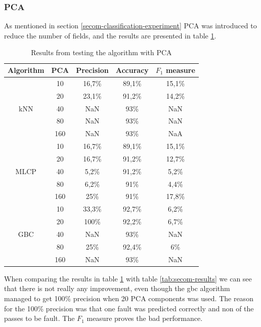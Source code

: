 \documentclass[english, a4paper]{report}
\begin{document}
{{{            \subsubsection{PCA}
            {                
                As mentioned in section \ref{secom-classification-experiment} PCA was introduced to reduce the number of fields, and the results are presented in table \ref{tab:secom-pca-results}.
                \begin{table}[H]
                    \centering
                    \begin{tabular}{|c|c|c|c|c|}
                    \hline
                    \textbf{   Algorithm   } & \textbf{   PCA   } & \textbf{   Precision   } & \textbf{   Accuracy   } & \textbf{   $F_1$ measure   } \\ \hline
                    \multirow{5}{*}{kNN} & 10 & 16,7\% & 89,1\% & 15,1\% \\ \cline{2-5} 
                     & 20 & 23,1\% & 91,2\% & 14,2\% \\ \cline{2-5} 
                     & 40 & NaN & 93\% & NaN \\ \cline{2-5} 
                     & 80 & NaN & 93\% & NaN \\ \cline{2-5} 
                     & 160 & NaN & 93\% & NaA \\ \hline
                    \multirow{5}{*}{MLCP} & 10 & 16,7\% & 89,1\% & 15,1\% \\ \cline{2-5} 
                     & 20 & 16,7\% & 91,2\% & 12,7\% \\ \cline{2-5} 
                     & 40 & 5,2\% & 91,2\% & 5,2\% \\ \cline{2-5} 
                     & 80 & 6,2\% & 91\% & 4,4\% \\ \cline{2-5} 
                     & 160 & 25\% & 91\% & 17,8\% \\ \hline
                    \multirow{5}{*}{GBC} & 10 & 33,3\% & 92,7\% & 6,2\% \\ \cline{2-5} 
                     & 20 & 100\% & 92,2\% & 6,7\% \\ \cline{2-5} 
                     & 40 & NaN & 93\% & NaN \\ \cline{2-5} 
                     & 80 & 25\% & 92,4\% & 6\% \\ \cline{2-5} 
                     & 160 & NaN & 93\% & NaN \\ \hline
                    \end{tabular}
                    \caption{Results from testing the algorithm  with PCA}
                    \label{tab:secom-pca-results}
                \end{table}
                When comparing the results in table \ref{tab:secom-pca-results} with table \ref{tab:secom-results} we can see that there is not really any improvement, even though the \gls{gbc} algorithm managed to get 100\% precision when 20 PCA components was used. The reason for the 100\% precision was that one fault was predicted correctly and non of the passes to be fault. The $F_1$ measure proves the bad performance. 
            }
        }
    }    
    
}
\end{document}
